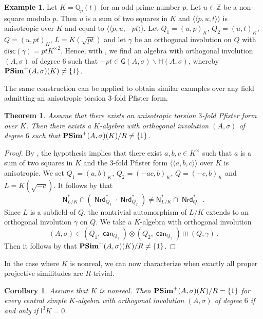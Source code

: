 \documentclass[twoside,11pt]{amsart}
\numberwithin{equation}{section}
\newtheorem{thm}[equation]{Theorem}
\newtheorem{cor}[equation]{Corollary}
\theoremstyle{definition}
\newtheorem{ex}[equation]{Example}
\newcommand\Nrd{\operatorname{\mathsf{Nrd}}}
\newcommand\N{\operatorname{N}}
\newcommand{\can}{\operatorname{\mathsf{can}}}
\newcommand{\mg}[1]{{#1}^{\times}}
\newcommand{\sq}[1]{{#1}^{\times 2}}
\newcommand{\s}{\sigma}
\newcommand{\la}{\langle}
\newcommand{\ra}{\rangle}
\newcommand{\lla}{\la\!\la}
\newcommand{\rra}{\ra\!\ra}
\newcommand{\I}{\mathsf{I}}
\renewcommand{\N}{\mathsf{N}}
\newcommand{\disc}{\mathsf{disc}}
\newcommand{\G}{\mathsf{G}}
\renewcommand{\H}{\mathsf{H}}
\renewcommand{\setminus}{\smallsetminus}
\newcommand{\zz}{\mathbb{Z}}
\renewcommand{\setminus}{\smallsetminus}
\begin{document}
\begin{ex}
Let $K=\mathbb{Q}_p(t)$ for an odd prime number $p$.
Let $u\in \zz$ be a non-square modulo $p$.
Then $u$ is a sum of two squares in $K$ and 
$\lla p, u, t\rra$ is anisotropic over $K$ and equal to $\lla p,u,-pt\rra$.
Let $Q_1=(u,p)_K$, $Q_2=(u,t)_K$, $Q=(u,pt)_K$, $L=K(\sqrt{pt})$ and let $\gamma$ be an orthogonal involution on $Q$ with $\disc(\gamma)=pt\sq{K}$.
Hence, with , we find an algebra with orthogonal involution $(A,\s)$ of degree $6$ such that $-pt\in\G(A,\s)\setminus\H(A,\s)$, whereby ${\bf PSim}^+(A,\s)(K)\neq \{1\}$.
\end{ex}

The same construction can be applied to obtain similar examples over any field admitting an anisotropic torsion $3$-fold Pfister form.

\begin{thm}\label{T:main}
Assume that there exists an anisotropic torsion $3$-fold Pfister form over $K$.
Then there exists a $K$-algebra with orthogonal involution $(A,\s)$ of degree $6$ such that ${\bf PSim}^+(A,\s)(K)/R\neq\{1\}$.    
\end{thm}
\begin{proof}
    By \cite[Chap.~XI, Theorem 4.5]{Lam05}, the hypothesis implies that there exist $a,b,c\in\mg{K}$ such that $a$ is a sum of two squares in $K$ and the $3$-fold Pfister form $\lla a,b,c\rra$ over $K$ is anisotropic.
We set 
$Q_1=(a,b)_K$, $Q_2=(-ac,b)_K$, $Q=(-c,b)_K$ and $L=K(\sqrt{-c})$.
It follows by   that
$$\N_{L/K}^\ast\cap(\Nrd_{Q_1}^\ast\cdot \Nrd_{Q_2}^\ast)\neq \N^\ast_{L/K}\cap \Nrd^\ast_{Q_1}\,.$$
Since $L$ is a subfield of $Q$, the nontrivial automorphism of $L/K$ extends to an  orthogonal involution $\gamma$ on $Q$. 
We take a $K$-algebra with orthogonal involution $$(A,\s)\in (Q_1,\can_{Q_1})\otimes (Q_2,\can_{Q_2})\boxplus (Q,\gamma)\,.$$
Then it follows by  that ${\bf PSim}^+(A,\s)(K)/R\neq \{1\}$.
\end{proof}

In the case where $K$ is nonreal, we can now characterize when exactly all proper projective similitudes are $R$-trivial.

\begin{cor}
    Assume that $K$ is nonreal. Then ${\bf PSim}^+(A,\s)(K)/R=\{1\}$ for every central simple $K$-algebra with orthogonal involution $(A,\s)$ of degree $6$ if and only if $\I^{3}K=0$.    
\end{cor}
\end{document}
